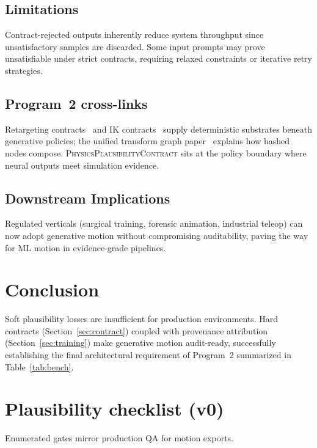 \documentclass[sigconf,nonacm]{acmart}
\newcommand{\plausibility}{\textsc{PhysicsPlausibilityContract}}
\begin{document}
\subsection{Limitations}
Contract-rejected outputs inherently reduce system throughput since unsatisfactory samples are discarded. Some input prompts may prove unsatisfiable under strict contracts, requiring relaxed constraints or iterative retry strategies. %

\subsection{Program~2 cross-links}
Retargeting contracts~\cite{paper-6-anim-sca2027} and IK contracts~\cite{paper-7-ik-siggraph2027} supply deterministic substrates beneath generative policies; the unified transform graph paper~\cite{paper-8-unified-siggraph2027} explains how hashed nodes compose. \plausibility{} sits at the policy boundary where neural outputs meet simulation evidence. %

\subsection{Downstream Implications}
Regulated verticals (surgical training, forensic animation, industrial teleop) can now adopt generative motion without compromising auditability, paving the way for ML motion in evidence-grade pipelines. %

\section{Conclusion}
\label{sec:conclusion}

Soft plausibility losses are insufficient for production environments. Hard contracts (Section~\ref{sec:contract}) coupled with provenance attribution (Section~\ref{sec:training}) make generative motion audit-ready, successfully establishing the final architectural requirement of Program~2 summarized in Table~\ref{tab:bench}.

\appendix
\section{Plausibility checklist (v0)}
\label{app:check}
Enumerated gates mirror production QA for motion exports.
\end{document}
